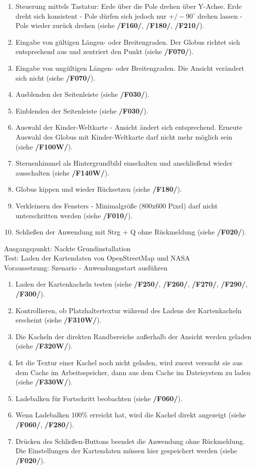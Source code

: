 \documentclass[10pt]{scrreprt}
\begin{document}
\begin{enumerate}[leftmargin = 2.5cm, resume]
\item Steuerung mittels Tastatur: Erde über die Pole drehen über Y-Achse. Erde dreht sich konsistent - Pole dürfen sich jedoch nur $+/- 90^\circ$ drehen lassen - Pole wieder zurück drehen (siehe \textbf{/F160/}, \textbf{/F180/}, \textbf{/F210/}).
\item Eingabe von gültigen Längen- oder Breitengraden. Der Globus richtet sich entsprechend aus und zentriert den Punkt (siehe \textbf{/F070/}).
\item Eingabe von ungültigen Längen- oder Breitengraden. Die Ansicht verändert sich nicht (siehe \textbf{/F070/}).
\item Ausblenden der Seitenleiste (siehe \textbf{/F030/}).
\item Einblenden der Seitenleiste (siehe \textbf{/F030/}).
\wunsch
\item Auswahl der Kinder-Weltkarte - Ansicht ändert sich entsprechend. Erneute Auswahl des Globus mit Kinder-Weltkarte darf nicht mehr möglich sein (siehe \textbf{/F100W/}).
\item Sternenhimmel als Hintergrundbild einschalten und anschließend wieder ausschalten (siehe \textbf{/F140W/}).
\muss
\item Globus kippen und wieder Rücksetzen (siehe \textbf{/F180/}).
\item Verkleinern des Fensters - Minimalgröße (800x600 Pixel) darf nicht unterschritten werden (siehe \textbf{/F010/}).
\item Schließen der Anwendung mit Strg + Q ohne Rückmeldung (siehe \textbf{/F020/}).
\end{enumerate}

\vspace{1.0cm}
Ausgangspunkt: Nackte Grundinstallation \\
Test: Laden der Kartendaten von OpenStreetMap und NASA \\
Voraussetzung: Szenario - Anwendungsstart ausführen
\begin{enumerate}[leftmargin = 2.5cm, resume]
\item Laden der Kartenkacheln testen (siehe \textbf{/F250/}, \textbf{/F260/}, \textbf{/F270/}, \textbf{/F290/}, \textbf{/F300/}).
\wunsch
\item Kontrollieren, ob Platzhaltertextur während des Ladens der Kartenkacheln erscheint (siehe \textbf{/F310W/}).
\item Die Kacheln der direkten Randbereiche außerhalb der Ansicht werden geladen (siehe \textbf{/F320W/}).
\item Ist die Textur einer Kachel noch nicht geladen, wird zuerst versucht sie aus dem Cache im Arbeitsspeicher, dann aus dem Cache im Dateisystem zu laden (siehe \textbf{/F330W/}).
\muss
\item Ladebalken für Fortschritt beobachten (siehe \textbf{/F060/}).
\item Wenn Ladebalken 100\% erreicht hat, wird die Kachel direkt angezeigt (siehe \textbf{/F060/}, \textbf{/F280/}).
\item Drücken des Schließen-Buttons beendet die Anwendung ohne Rückmeldung. Die Einstellungen der Kartendaten müssen hier gespeichert werden (siehe \textbf{/F020/}).
\end{enumerate}
\end{document}
